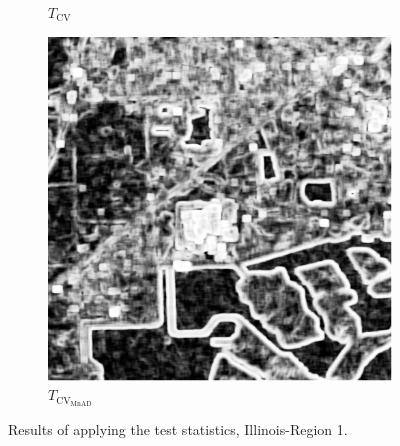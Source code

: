 \begin{figure}[H]
\begin{subfigure}[b]{0.3\textwidth}
    \caption{$T_\text{CV}$}
    \label{fig:test_lake-2}
  \end{subfigure}
  \hfill
  \begin{subfigure}[b]{0.3\textwidth}
    \centering
    \includegraphics[width=\textwidth]{../../Figures/PNG/mnad_lake_512}
    \caption{$T_{\text{CV}_{\text{MnAD}}}$}
    \label{fig:test_lake-3}
  \end{subfigure}
  \caption{Results of applying the test statistics, Illinois-Region 1.}
  \label{fig:test_lake}
\end{figure}



